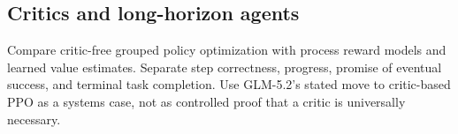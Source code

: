 \subsection{Critics and long-horizon agents}
Compare critic-free grouped policy optimization with process reward models and learned
value estimates. Separate step correctness, progress, promise of eventual success, and
terminal task completion. Use GLM-5.2's stated move to critic-based PPO as a systems case,
not as controlled proof that a critic is universally necessary.
